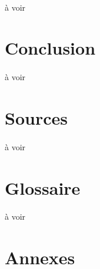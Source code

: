 \documentclass[a4paper,12pt]{extarticle}
\begin{document}
\paragraph{}
à voir\\

\clearpage

\section{Conclusion}

\paragraph{}
à voir\\

\clearpage

\section{Sources}

\paragraph{}
à voir\\

\section{Glossaire}

\paragraph{}
à voir\\

\clearpage

\section{Annexes}

\begin{center}
\end{center}
\end{document}
